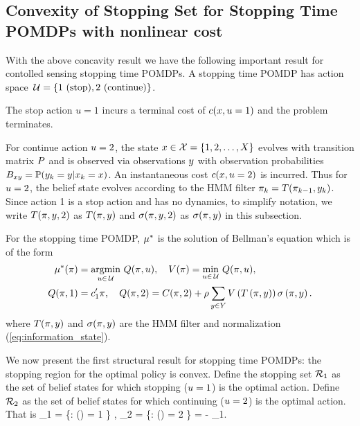 \documentclass[draftcls,onecolumn]{IEEEtran}
\begin{document}
\subsection{Convexity of Stopping Set for Stopping Time POMDPs with nonlinear cost}
With the above concavity result we have the following important result for contolled sensing stopping time POMDPs.
A stopping time  POMDP has  action space $\,\mathcal{U} = \{1 \text{ (stop)},2 \text{ (continue)}\}$.


The  stop action  $u=1$ incurs a terminal cost
of $c(x,u=1)$ and the problem terminates.


For continue action $u= 2$, the  state $x \in \mathcal{X} = \{1,2,\ldots,X\}$  evolves with transition matrix $P$ and is observed
 via observations
$y$ with
observation probabilities $B_{xy} = \mathbb{P}(y_k=y|x_k=x)$.   An instantaneous  cost $c(x,u=2)$ is incurred. Thus for $u=2$, 
the belief state evolves according to the HMM filter
$\pi_{k} = T(\pi_{k-1},y_k)$. Since  action 1 is  a stop action and has no dynamics, to simplify notation,
we write $T(\pi,y,2)$ as $T(\pi,y)$ and $\sigma(\pi,y,2)$ as $\sigma(\pi,y)$  in this subsection.



For the  stopping time POMDP, $\mu^*$ is the solution of
 Bellman's equation which is of the form  
\begin{align} \label{eq:bellmanstop}
 \optpolicy(\belief) &=  \underset{\action \in \actionspace}\argmin ~\valueaction(\belief,\action), \quad 
\optvalue(\belief) = \underset{\action \in \actionspace}\min ~\valueaction(\belief,\action),     \\
  \valueaction(\belief,1) &= \cost_1^\prime\belief , \quad
  \valueaction(\belief,2) =  \Cost(\belief,2) + \discount\sum_{\obs \in \obsdim} \optvalue\left(\filter\left(\belief,\obs\right)\right)\filternorm \left(\belief,\obs\right).
\nonumber 
\end{align}
where $T(\pi,y)$ and $\sigma(\pi,y)$ are the HMM filter and normalization (\ref{eq:information_state}).

We now present the first  structural result for stopping time POMDPs:  the stopping region for the optimal policy is convex.
Define the stopping set $\mathcal{R}_1$  as the set of belief states for which stopping ($u=1$)  is the optimal action.
Define $\mathcal{R}_2$ as the set of belief states for which continuing ($u=2$) is the optimal action. That is
\beq
\region_1 = \{\belief:  \optpolicy(\belief) = 1  \} , \quad \region_2 =  \{\belief:  \optpolicy(\belief) = 2 \} = \Belief - \region_1.\eeq
\end{document}
